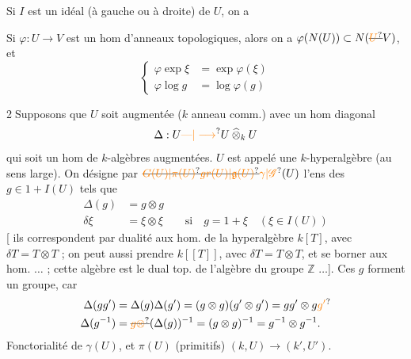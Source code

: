 Si  $I$ est un idéal (à gauche ou à droite)  de $U$,
on a

Si $\varphi:U\longrightarrow V$ est un hom d'anneaux topologiques,
alors on a $\varphi(N(U))\subset N(\deleted{\unsure{U}}V)$, et
\[
\left\{\begin{aligned}
\varphi\exp\xi&=\exp\varphi(\xi)\\
\varphi\log g&=\log\varphi(g)
\end{aligned}\right.
\]

\textcircled{2}\quad Supposons que $U$ soit  
augmentée ($k$ anneau comm.) avec un
hom diagonal
\[
\Delta:U\unsure{\text{—}|\longrightarrow} U\mathbin{\widehat\otimes}_k U
\]
qui soit un hom de $k$-algèbres augmentées.
$U$ est appelé une $k$-hyperalgèbre  (au sens
large). On désigne par $\deleted{\unsure{G(U)|\pi(U)}}\deleted{\unsure{gr(U)|\mathfrak g(U)}}\unsure{\gamma|\mathscr G}(U)$ l'ens
des $g\in 1+I(U)$  tels que
\[
\begin{aligned}
\Delta(g)&=g\otimes g\\
\delta\xi&=\xi\otimes\xi\qquad\text{si}\quad g=1+\xi\quad(\xi\in I(U))
\end{aligned}
\]
[ ils correspondent par dualité aux
hom. de la hyperalgèbre 
$k[T]$, avec $\delta T=T\otimes T$ ; on peut aussi
prendre $k[[T]]$, avec $\delta T=T\otimes T$, et
se borner aux hom.  $\ldots$ \unsure{]|\}} ;
cette algèbre est le dual top. de
l'algèbre du groupe $\mathbb Z$ $\ldots$].
 Ces $g$ forment un groupe, car
\[
\begin{aligned}
\Delta(gg')&=\Delta(g)\Delta(g')=(g\otimes g)(g'\otimes g')=gg'\otimes g\unsure{g'}\\
\Delta(g^{-1})&=\deleted{\unsure{g\otimes}}(\Delta(g))^{-1}=(g\otimes g)^{-1}=g^{-1}\otimes g^{-1}.
\end{aligned}
\]
Fonctorialité de $\gamma(U)$, et $\pi(U)$ (primitifs)
  $(k,U)\longrightarrow(k',U')$.

